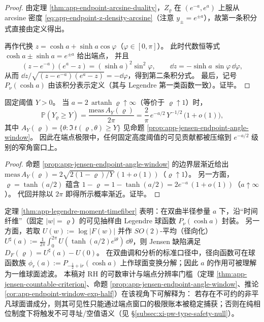 \begin{proof}
由定理 \ref{thm:app-endpoint-arcsine-duality}，\(Z_{\varrho}\) 在 \((e^{-a},e^{a})\) 上服从 arcsine 密度 \eqref{eq:app-endpoint-z-density-arcsine}（注意 \(y_{\pm}=e^{\pm a}\)），故第一条积分式直接由定义得出。
\par
再作代换 \(z=\cosh a+\sinh a\cos\varphi\)（\(\varphi\in[0,\pi]\)）。
此时代数恒等式 \(\cosh a\pm\sinh a=e^{\pm a}\) 给出端点，
并且
\[
(z-e^{-a})(e^{a}-z)=(\sinh a)^{2}\sin^{2}\varphi,
\qquad
\dd z=-\sinh a\,\sin\varphi\,\dd\varphi,
\]
从而
\(
\dd z/\sqrt{(z-e^{-a})(e^{a}-z)}=-\dd\varphi
\)，得到第二条积分式。
最后，记号 \(P_{\nu}(\cosh a)\) 由该积分表示定义（其与 Legendre 第一类函数一致）。证毕。
\end{proof}

\begin{corollary}\label{cor:app-endpoint-window-exp-half}
固定阈值 \(Y>0\)。
当 \(a=2\,\operatorname{artanh}\varrho\uparrow\infty\)（等价于 \(\varrho\uparrow 1\)）时，
\[
\mathbb{P}(Y_{\varrho}\ge Y)
=\frac{\mathrm{meas}\,A_{Y}(\varrho)}{2\pi}
=\frac{2}{\pi}\,e^{-a/2}\,Y^{-1/2}\,\bigl(1+o(1)\bigr),
\]
其中 \(A_Y(\varrho)=\{\theta:\Im\,t(\varrho,\theta)\ge Y\}\) 见命题 \ref{prop:app-jensen-endpoint-angle-window}。
因此在端点极限中，任何固定高度阈值的可见贡献都被压缩到 \(e^{-a/2}\) 级别的窄角窗口上。
\end{corollary}

\begin{proof}
命题 \ref{prop:app-jensen-endpoint-angle-window} 的边界层渐近给出
\(
\mathrm{meas}\,A_Y(\varrho)=2\sqrt{2(1-\varrho)/Y}\,(1+o(1))
\)（\(\varrho\uparrow 1\)）。
另一方面，\(\varrho=\tanh(a/2)\) 蕴含
\(
1-\varrho=1-\tanh(a/2)=2e^{-a}\,(1+o(1))
\)（\(a\uparrow\infty\)）。
代回并除以 \(2\pi\) 即得所示概率渐近。证毕。
\end{proof}

\begin{remark}\label{rem:app-jensen-spherical-filter-view}
定理 \ref{thm:app-legendre-moment-timefiber} 表明：在双曲半径参量 \(a\) 下，沿“时间纤维”（固定 \(|w|=\varrho\)）的可见抽样由 Legendre 球函数 \(P_{\nu}(\cosh a)\) 封装。
另一方面，若取 \(U(w):=\log|F(w)|\) 并作 \(SO(2)\)-平均（径向化）
\(
U^{\sharp}(a):=\frac{1}{2\pi}\int_{0}^{2\pi}U(\tanh(a/2)e^{\mathrm{i}\theta})\,\dd\theta
\)，则 Jensen 缺陷满足 \(D_F(\varrho)=U^{\sharp}(a)-U(0)\)。
在双曲调和分析的标准口径中，径向函数可在球函数族
\(
\phi_{r}(a):=P_{-\frac12+\mathrm{i}r}(\cosh a)
\)
上作球面变换分解；因此 \(a\) 的作用可被理解为一维球面滤波。
本稿对 RH 的可数审计与端点分辨率门槛（定理 \ref{thm:app-jensen-countable-criterion}、命题 \ref{prop:app-jensen-endpoint-angle-window}、推论 \ref{cor:app-endpoint-window-exp-half}）在该视角下可解释为：
若存在不可约的非平凡球面谱成分，则其可见性只能通过端点窗口的极限账本被稳定捕获；否则在纯相位制度下将触发不可寻址/空值语义（见 \S\ref{subsec:xi-pw-type-safety-null}）。
\end{remark}

\endinput
